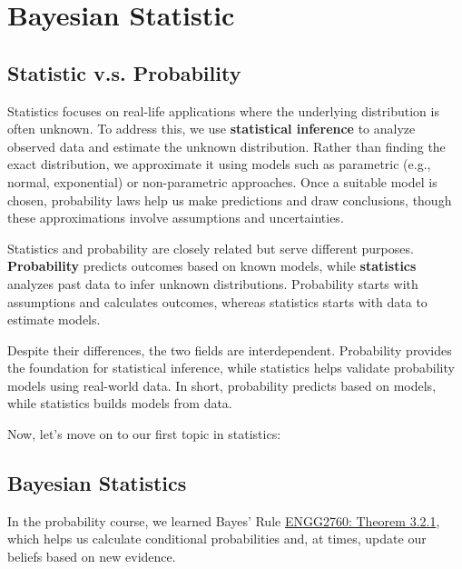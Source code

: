 \chapter{Bayesian Statistic}

\section{Statistic v.s. Probability}

Statistics focuses on real-life applications where the underlying distribution is often unknown. To address this, we use \textbf{statistical inference} to analyze observed data and estimate the unknown distribution. Rather than finding the exact distribution, we approximate it using models such as parametric (e.g., normal, exponential) or non-parametric approaches. Once a suitable model is chosen, probability laws help us make predictions and draw conclusions, though these approximations involve assumptions and uncertainties.  

Statistics and probability are closely related but serve different purposes. \textbf{Probability} predicts outcomes based on known models, while \textbf{statistics} analyzes past data to infer unknown distributions. Probability starts with assumptions and calculates outcomes, whereas statistics starts with data to estimate models.  

Despite their differences, the two fields are interdependent. Probability provides the foundation for statistical inference, while statistics helps validate probability models using real-world data. In short, probability predicts based on models, while statistics builds models from data.  

Now, let's move on to our first topic in statistics: 


\section{Bayesian Statistics}
In the probability course, we learned Bayes' Rule \href{https://ryanc.wtf/files/ENGG2760.pdf#page=14}{ENGG2760: Theorem 3.2.1}, which helps us calculate conditional probabilities and, at times, update our beliefs based on new evidence.

